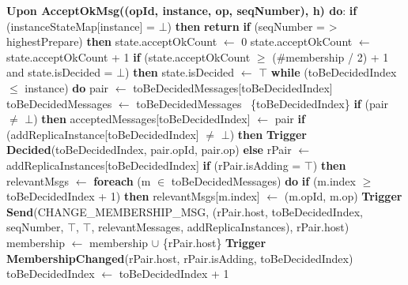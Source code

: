 \documentclass[sigconf]{acmart}
\begin{document}
\begin{algorithmic}[1]
\State \textbf{Upon AcceptOkMsg((opId, instance, op, seqNumber), h) do}:
\State \quad \textbf{if} (instanceStateMap[instance] = $\bot$) \textbf{then}
\State \quad \quad \textbf{return}
\State \quad \textbf{if} (seqNumber = > highestPrepare) \textbf{then}
\State \quad \quad state.acceptOkCount $\gets$ 0
\State \quad state.acceptOkCount $\gets$ state.acceptOkCount + 1
\State \quad \textbf{if} (state.acceptOkCount $\ge$ (\#membership / 2) + 1 and state.isDecided = $\bot$) \textbf{then}
\State \quad \quad state.isDecided $\gets$ $\top$
\State \quad \quad \textbf{while} (toBeDecidedIndex $\le$ instance) \textbf{do}
\State \quad \quad \quad pair $\gets$ toBeDecidedMessages[toBeDecidedIndex]
\State \quad \quad \quad toBeDecidedMessages $\gets$ toBeDecidedMessages \ \{toBeDecidedIndex\}
\State \quad \quad \quad \textbf{if} (pair $\neq$ $\bot$) \textbf{then}
\State \quad \quad \quad \quad acceptedMessages[toBeDecidedIndex] $\gets$ pair
\State \quad \quad \quad \quad \textbf{if} (addReplicaInstance[toBeDecidedIndex] $\neq$ $\bot$) \textbf{then}
\State \quad \quad \quad \quad \quad \textbf{Trigger Decided}(toBeDecidedIndex, pair.opId, pair.op)
\State \quad \quad \quad \quad \textbf{else}
\State \quad \quad \quad \quad \quad rPair $\gets$ addReplicaInstances[toBeDecidedIndex]
\State \quad \quad \quad \quad \quad \textbf{if} (rPair.isAdding = $\top$) \textbf{then}
\State \quad \quad \quad \quad \quad \quad relevantMsgs $\gets$ {}
\State \quad \quad \quad \quad \quad \quad \textbf{foreach} (m $\in$ toBeDecidedMessages) \textbf{do}
\State \quad \quad \quad \quad \quad \quad \quad \textbf{if} (m.index $\ge$ toBeDecidedIndex + 1) \textbf{then}
\State \quad \quad \quad \quad \quad \quad \quad \quad relevantMsgs[m.index] $\gets$  (m.opId, m.op)
\State \quad \quad \quad \quad \quad \quad \textbf{Trigger Send}(CHANGE\_MEMBERSHIP\_MSG, (rPair.host, toBeDecidedIndex, seqNumber, $\top$, $\top$, relevantMessages, addReplicaInstances), rPair.host)
\State \quad \quad \quad \quad \quad \quad membership $\gets$ membership $\cup$ \{rPair.host\}
\State \quad \quad \quad \quad \quad \textbf{Trigger MembershipChanged}(rPair.host, rPair.isAdding, toBeDecidedIndex)
\State \quad \quad \quad toBeDecidedIndex $\gets$ toBeDecidedIndex + 1 \\ 
\end{algorithmic}
\end{document}
